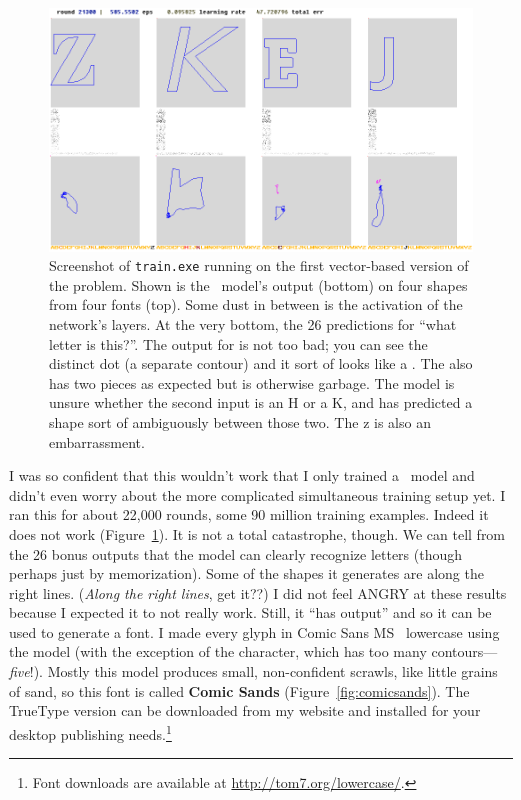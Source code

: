 \documentclass[twocolumn]{article} %
\begin{document}
\begin{figure}[ht]
\centering
  \includegraphics[width=0.9 \linewidth]{trainingvector}
\caption{ Screenshot of {\tt train.exe} running on the first vector-based
  version of the problem. Shown is the \makelowercase\ model's output
  (bottom) on four shapes from four fonts (top). Some dust in between
  is the activation of the network's layers. At the very bottom, the
  26 predictions for ``what letter is this?''. The output for
   is not too bad; you can see the distinct dot (a
  separate contour) and it sort of looks like a . The
   also has two pieces as expected but is otherwise
  garbage. The model is unsure whether the second input is an H
  or a K, and has predicted a shape sort of ambiguously between those
  two. The \lowercase{z} is also an embarrassment.
} \label{fig:trainingvector}
\end{figure}

I was so {\tiny confident} that this wouldn't work that I only trained
a \makelowercase\ model and didn't even worry about the more
complicated simultaneous training setup yet. I ran this for about
22,000 rounds, some 90 million training examples. Indeed it does not
work (Figure~\ref{fig:trainingvector}). It is not a total catastrophe,
though. We can tell from the 26 bonus outputs that the model can
clearly recognize letters (though perhaps just by memorization). Some
of the shapes it generates are along the right lines. ({\em Along the
  right lines}, get it??) I did not feel ANGRY at these results
because I expected it to not really work. Still, it ``has output'' and
so it can be used to generate a font. I made every glyph in Comic Sans
MS~\cite{comicsans} lowercase using the model (with the exception of the
 character, which has too many contours---{\it five}!).
Mostly this model produces small, non-confident scrawls, like little
grains of sand, so this font is called {\bf Comic Sands}
(Figure~\ref{fig:comicsands}). The TrueType version can be downloaded
from my website and installed for your desktop publishing
needs.\footnote{Font downloads are available at
  \url{http://tom7.org/lowercase/}.}
\end{document}
